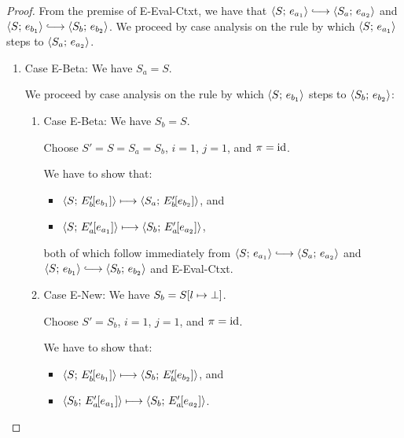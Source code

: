 \begin{proof}
  From the premise of {\sc E-Eval-Ctxt}, we have that
  $\config{S}{e_{a_1}} \parstepsto \config{S_a}{e_{a_2}}$ and
  $\config{S}{e_{b_1}} \parstepsto \config{S_b}{e_{b_2}}$.  We proceed
  by case analysis on the rule by which $\langle S;\, e_{a_1} \rangle$ steps to
  $\langle S_a;\, e_{a_2} \rangle$.

  \begin{enumerate}
  \item Case {\sc E-Beta}: We have $S_a = S$.

    We proceed by case analysis on the rule by which
    $\langle S;\, e_{b_1} \rangle$ steps to $\langle S_b;\, e_{b_2} \rangle$:
    \begin{enumerate}
    \item \label{lvars-slc-beta-beta}Case {\sc E-Beta}: We have $S_b =
      S$.

      Choose $S' = S = S_a = S_b$, $i = 1$, $j = 1$, and $\pi = \mathrm{id}$.

      We have to show that:
      \begin{itemize}
      \item $\langle S;\, E'_b\hspace{-1mm}\left[e_{b_1}\right] \rangle \longmapsto
        \langle S_a;\, E'_b\hspace{-1mm}\left[e_{b_2}\right] \rangle$, and
      \item $\langle S;\, E'_a\hspace{-1mm}\left[e_{a_1}\right] \rangle \longmapsto
        \langle S_b;\, E'_a\hspace{-1mm}\left[e_{a_2}\right] \rangle$, 
      \end{itemize}

      both of which follow immediately from $\config{S}{e_{a_1}}
      \parstepsto \config{S_a}{e_{a_2}}$ and $\config{S}{e_{b_1}}
      \parstepsto \config{S_b}{e_{b_2}}$ and {\sc E-Eval-Ctxt}.

    \item \label{lvars-slc-beta-new}Case {\sc E-New}: We have $S_b =
      S[l \mapsto \bot]$.

      Choose $S' = S_b$, $i = 1$, $j = 1$, and $\pi = \mathrm{id}$.

      We have to show that:
      \begin{itemize}
      \item $\langle S;\, E'_b\hspace{-1mm}\left[e_{b_1}\right] \rangle \longmapsto
        \langle S_b;\, E'_b\hspace{-1mm}\left[e_{b_2}\right] \rangle$, and
      \item
        $\langle S_b;\, E'_a\hspace{-1mm}\left[e_{a_1}\right] \rangle \longmapsto
        \langle S_b;\, E'_a\hspace{-1mm}\left[e_{a_2}\right] \rangle$.
      \end{itemize}


\end{enumerate}
\end{enumerate}
\end{proof}

